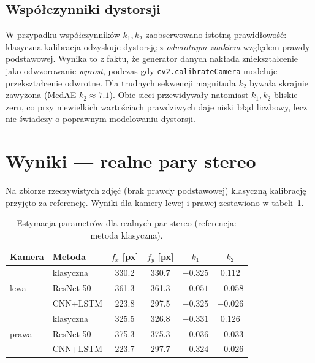 \documentclass[12pt,a4paper]{report}
\begin{document}
\subsection{Współczynniki dystorsji}
W przypadku współczynników $k_1, k_2$ zaobserwowano istotną prawidłowość: klasyczna
kalibracja odzyskuje dystorsję z \emph{odwrotnym znakiem} względem prawdy podstawowej.
Wynika to z faktu, że generator danych nakłada zniekształcenie jako odwzorowanie
\emph{wprost}, podczas gdy \texttt{cv2.calibrateCamera} modeluje przekształcenie odwrotne.
Dla trudnych sekwencji magnituda $k_2$ bywała skrajnie zawyżona (MedAE $k_2 \approx 7.1$).
Obie sieci przewidywały natomiast $k_1, k_2$ bliskie zeru, co przy niewielkich wartościach
prawdziwych daje niski błąd liczbowy, lecz nie świadczy o poprawnym modelowaniu dystorsji.

\section{Wyniki --- realne pary stereo}
Na zbiorze rzeczywistych zdjęć (brak prawdy podstawowej) klasyczną kalibrację przyjęto za
referencję. Wyniki dla kamery lewej i prawej zestawiono w tabeli~\ref{tab:wyniki-pairs}.

\begin{table}[htbp]
  \centering
  \caption{Estymacja parametrów dla realnych par stereo (referencja: metoda klasyczna).}
  \label{tab:wyniki-pairs}
  \begin{tabular}{@{}llcccc@{}}
    \toprule
    \textbf{Kamera} & \textbf{Metoda} & \textbf{$f_x$ [px]} & \textbf{$f_y$ [px]} & \textbf{$k_1$} & \textbf{$k_2$} \\
    \midrule
    \multirow{3}{*}{lewa}
      & klasyczna & 330.2 & 330.7 & $-0.325$ & $0.112$ \\
      & ResNet-50 & 361.3 & 361.3 & $-0.051$ & $-0.058$ \\
      & CNN+LSTM  & 223.8 & 297.5 & $-0.325$ & $-0.026$ \\
    \midrule
    \multirow{3}{*}{prawa}
      & klasyczna & 325.5 & 326.8 & $-0.331$ & $0.126$ \\
      & ResNet-50 & 375.3 & 375.3 & $-0.036$ & $-0.033$ \\
      & CNN+LSTM  & 223.7 & 297.7 & $-0.324$ & $-0.026$ \\
    \bottomrule
  \end{tabular}
\end{table}
\end{document}
